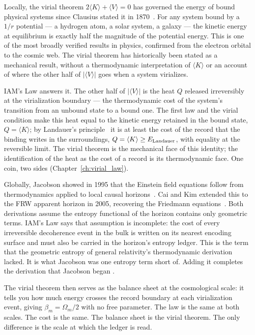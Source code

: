 Locally, the virial theorem $2\langle K\rangle+\langle V\rangle=0$ has governed the energy of bound physical systems since Clausius stated it in
1870~\cite{Clausius1870}. For any system bound by a $1/r$ potential --- a hydrogen atom, a solar system, a galaxy --- the kinetic energy at equilibrium is
exactly half the magnitude of the potential energy. This is one of the most broadly verified results in physics, confirmed from the electron orbital to the
cosmic web. The virial theorem has historically been stated as a mechanical result, without a thermodynamic interpretation of $\langle K\rangle$ or an
account of where the other half of $|\langle V\rangle|$ goes when a system virializes.

IAM's Law answers it. The other half of $|\langle V\rangle|$ is the heat $Q$ released irreversibly at the virialization boundary --- the thermodynamic cost of
the system's transition from an unbound state to a bound one. The first law and the virial condition make this heat equal to the kinetic energy retained
in the bound state, $Q=\langle K\rangle$; by Landauer's principle~\cite{Landauer1961} it is at least the cost of the record that the binding writes in the
surroundings, $Q=\langle K\rangle\ge E_{\rm Landauer}$, with equality at the reversible limit. The virial theorem is the mechanical face of this identity;
the identification of the heat as the cost of a record is its thermodynamic face. One coin, two sides (Chapter~\ref{ch:virial_law}).

Globally, Jacobson showed in 1995 that the Einstein field equations follow from thermodynamics applied to local causal horizons~\cite{Jacobson1995}. Cai
and Kim extended this to the FRW apparent horizon in 2005, recovering the Friedmann equations~\cite{CaiKim2005}. Both derivations assume the entropy
functional of the horizon contains only geometric terms. IAM's Law says that assumption is incomplete: the cost of every irreversible decoherence event in
the bulk is written on its nearest encoding surface and must also be carried in the horizon's entropy ledger. This is the term that the geometric entropy of general relativity's thermodynamic derivation lacked. It is what Jacobson was one
entropy term short of. Adding it completes the derivation that Jacobson began \interp.

The virial theorem then serves as the balance sheet at the cosmological scale: it tells you how much energy crosses the record boundary at each
virialization event, giving $\beta_m=\Omega_m/2$ with no free parameter. The law is the same at both scales. The cost is the same. The balance sheet is the
virial theorem. The only difference is the scale at which the ledger is read.

